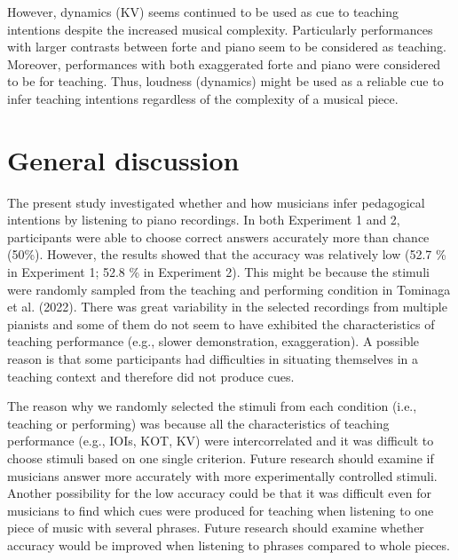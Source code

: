 \documentclass[
  man,floatsintext]{apa6}
\begin{document}
However, dynamics (KV) seems continued to be used as cue to teaching intentions despite the increased musical complexity. Particularly performances with larger contrasts between forte and piano seem to be considered as teaching. Moreover, performances with both exaggerated forte and piano were considered to be for teaching. Thus, loudness (dynamics) might be used as a reliable cue to infer teaching intentions regardless of the complexity of a musical piece.

\hypertarget{general-discussion}{%
\section{General discussion}\label{general-discussion}}

The present study investigated whether and how musicians infer pedagogical intentions by listening to piano recordings. In both Experiment 1 and 2, participants were able to choose correct answers accurately more than chance (50\%). However, the results showed that the accuracy was relatively low (52.7 \% in Experiment 1; 52.8 \% in Experiment 2). This might be because the stimuli were randomly sampled from the teaching and performing condition in Tominaga et al. (2022). There was great variability in the selected recordings from multiple pianists and some of them do not seem to have exhibited the characteristics of teaching performance (e.g., slower demonstration, exaggeration). A possible reason is that some participants had difficulties in situating themselves in a teaching context and therefore did not produce cues.

The reason why we randomly selected the stimuli from each condition (i.e., teaching or performing) was because all the characteristics of teaching performance (e.g., IOIs, KOT, KV) were intercorrelated and it was difficult to choose stimuli based on one single criterion. Future research should examine if musicians answer more accurately with more experimentally controlled stimuli. Another possibility for the low accuracy could be that it was difficult even for musicians to find which cues were produced for teaching when listening to one piece of music with several phrases. Future research should examine whether accuracy would be improved when listening to phrases compared to whole pieces.
\end{document}
